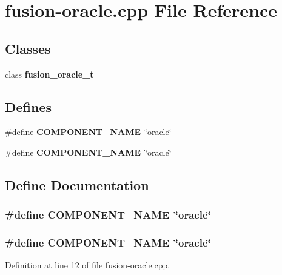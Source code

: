 \section{fusion-oracle.cpp File Reference}
\label{fusion-oracle_8cpp}
\subsection*{Classes}
\begin{CompactItemize}
\item 
class {\bf fusion\_\-oracle\_\-t}
\end{CompactItemize}
\subsection*{Defines}
\begin{CompactItemize}
\item 
\#define {\bf COMPONENT\_\-NAME}~\char`\"{}oracle\char`\"{}
\item 
\#define {\bf COMPONENT\_\-NAME}~\char`\"{}oracle\char`\"{}
\end{CompactItemize}


\subsection{Define Documentation}
\subsubsection[{COMPONENT\_\-NAME}]{\setlength{\rightskip}{0pt plus 5cm}\#define COMPONENT\_\-NAME~\char`\"{}oracle\char`\"{}}\label{zesto-bpred_8cpp_9146ade7ce24e3db226a973a59063892}


\subsubsection[{COMPONENT\_\-NAME}]{\setlength{\rightskip}{0pt plus 5cm}\#define COMPONENT\_\-NAME~\char`\"{}oracle\char`\"{}}\label{fusion-oracle_8cpp_9146ade7ce24e3db226a973a59063892}




Definition at line 12 of file fusion-oracle.cpp.